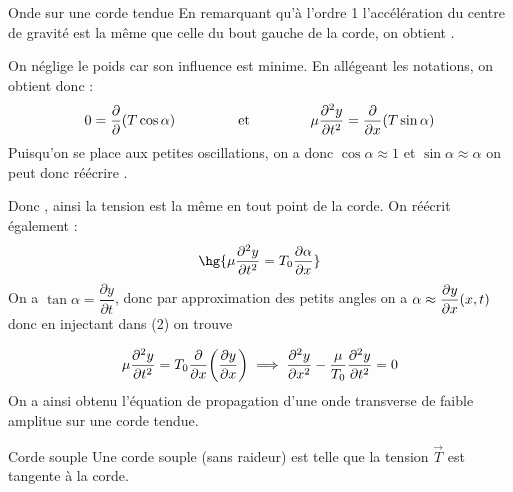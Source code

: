 \documentclass[a4paper,french,bookmarks]{book}
\begin{document}
\begin{example}{Onde sur une corde tendue}{}
        En remarquant qu'à l'ordre 1 l'accélération du centre de gravité est la même que celle du bout gauche de la corde, on obtient \qquad {}.
        
        On néglige le poids car son influence est minime. En allégeant les notations, on obtient donc :
        \[0 = \dfrac{\partial}{\partial}\!\left(T\cos\alpha\right) \qquad\qquad\ \text{et} \ \qquad\qquad \mu\dfrac{\partial^2 y}{\partial t^2} = \dfrac{\partial}{\partial x}\!\left(T\sin\alpha\right) \]
        Puisqu'on se place aux petites oscillations, on a donc $\cos\alpha \approx 1$ et $\sin\alpha \approx \alpha$ on peut donc réécrire .
        
        Donc , ainsi la tension est la même en tout point de la corde. On réécrit également : 
        \[ \hg{\mu\dfrac{\partial^2 y}{\partial t^2} = T_0\dfrac{\partial\alpha}{\partial x}} \]
         On a $\tan\alpha = \dfrac{\partial y}{\partial t}$, donc par approximation des petits angles on a $\alpha\approx\dfrac{\partial y}{\partial x}\!\left(x,t\right)$ donc en injectant dans (2) on trouve

        \[\mu\dfrac{\partial^2y}{\partial t^2}=T_0\dfrac{\partial}{\partial x}\!\left(\dfrac{\partial y}{\partial x}\right) \implies \dfrac{\partial^2y}{\partial x^2} - \dfrac{\mu}{T_0}\dfrac{\partial^2 y}{\partial t^2} = 0\]
        On a ainsi obtenu l'équation de propagation d'une onde transverse de faible amplitue sur une corde tendue.
    \end{example}

    \begin{definition}{Corde souple}{}
        Une corde souple (sans raideur) est telle que la tension $\vec{T}$ est tangente à la corde.
    \end{definition}
\end{document}
